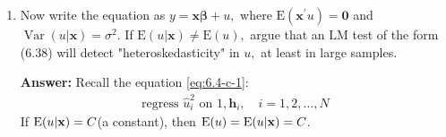 \documentclass[UTF8]{article} %
\begin{document}
\begin{enumerate}
\begin{enumerate}
        \item Now write the equation as $y=\mathbf{x} \boldsymbol{\beta}+u,$ where $\mathrm{E}\left(\mathbf{x}^{\prime} u\right)=\mathbf{0}$ and $\operatorname{Var}(u | \mathbf{x})=\sigma^{2}$. If $\mathrm{E}(u | \mathbf{x}) \neq \mathrm{E}(u),$ argue that an $\mathrm{LM}$ test of the form (6.38) will detect "heteroskedasticity" in $u,$ at least in large samples.
        
        \textbf{Answer:} Recall the equation \eqref{eq:6.4-c-1}: 
        \begin{gather}
            \text{regress } \hat{u}_i^2 \text{ on } 1, \mathbf{h}_i, \quad i = 1,2,\ldots,N \tag{6.38} \label{eq:6.4-c-1}
        \end{gather}
        If $\mathrm{E}(u|\mathbf{x}) = C$(a constant), then $\mathrm{E}(u) = \mathrm{E}(u|\mathbf{x}) = C$.
        
        
        
        
        
    \end{enumerate}
\end{enumerate}
\end{document}
